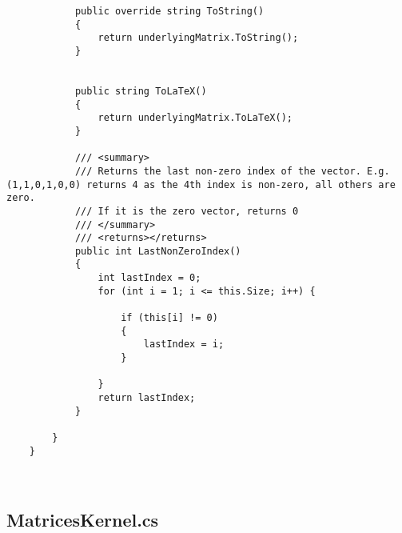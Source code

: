 \documentclass{article}
\begin{document}
\begin{lstlisting}
			public override string ToString()
			{
				return underlyingMatrix.ToString();
			}
			
			
			public string ToLaTeX()
			{
				return underlyingMatrix.ToLaTeX();
			}
			
			/// <summary>
			/// Returns the last non-zero index of the vector. E.g. (1,1,0,1,0,0) returns 4 as the 4th index is non-zero, all others are zero.
			/// If it is the zero vector, returns 0
			/// </summary>
			/// <returns></returns>
			public int LastNonZeroIndex()
			{
				int lastIndex = 0;
				for (int i = 1; i <= this.Size; i++) { 
					
					if (this[i] != 0)
					{
						lastIndex = i;
					}
					
				}
				return lastIndex;
			}
			
		}
	}
	
	
\end{lstlisting}

\subsection{MatricesKernel.cs}
\end{document}
